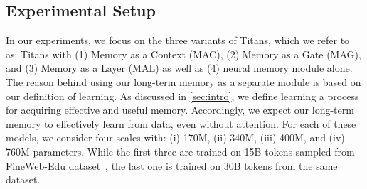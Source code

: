 \documentclass{article}
\newcommand{\citep}{\parencite}
\newcommand{\head}[1]{\vspace{1.7mm}\noindent{{\textcolor{c3}{\bf #1.}}}}
\begin{document}
\subsection{Experimental Setup}\label{sec:exp-setup}
\head{Models}
In our experiments, we focus on the three variants of Titans, which we refer to as: Titans with (1) Memory as a Context (MAC), (2) Memory as a Gate (MAG), and (3) Memory as a Layer (MAL) as well as (4) neural memory module alone. The reason behind using our long-term memory as a separate module is based on our definition of learning. As discussed in \autoref{sec:intro}, we define learning a process for acquiring effective and useful memory. Accordingly, we expect our long-term memory to effectively learn from data, even without attention. For each of these models, we consider four scales with: (i) 170M, (ii) 340M,  (iii) 400M, and (iv) 760M parameters. While the first three are trained on 15B tokens sampled from FineWeb-Edu dataset~\citep{penedo2024the}, the last one is trained on 30B tokens from the same dataset. 
\end{document}
